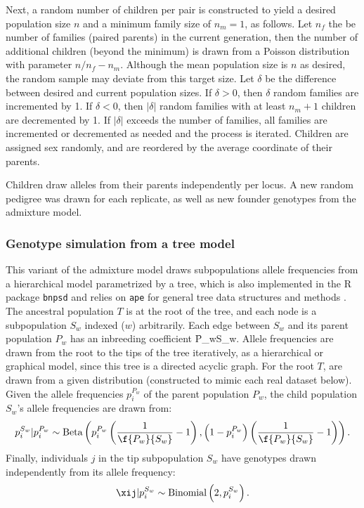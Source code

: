 \documentclass[11pt]{article}
\begin{document}
Next, a random number of children per pair is constructed to yield a desired population size $n$ and a minimum family size of $n_m=1$, as follows.
Let $n_f$ the be number of families (paired parents) in the current generation, then the number of additional children (beyond the minimum) is drawn from a Poisson distribution with parameter $n/n_f - n_m$.
Although the mean population size is $n$ as desired, the random sample may deviate from this target size.
Let $\delta$ be the difference between desired and current population sizes.
If $\delta > 0$, then $\delta$ random families are incremented by 1.
If $\delta < 0$, then $|\delta|$ random families with at least $n_m+1$ children are decremented by 1.
If $|\delta|$ exceeds the number of families, all families are incremented or decremented as needed and the process is iterated.
Children are assigned sex randomly, and are reordered by the average coordinate of their parents.

Children draw alleles from their parents independently per locus.
A new random pedigree was drawn for each replicate, as well as new founder genotypes from the admixture model.

\subsubsection{Genotype simulation from a tree model}

This variant of the admixture model draws subpopulations allele frequencies from a hierarchical model parametrized by a tree, which is also implemented in the R package \texttt{bnpsd} and relies on \texttt{ape} for general tree data structures and methods \citep{paradis_ape_2019}.
The ancestral population $T$ is at the root of the tree, and each node is a subpopulation $S_w$ indexed ($w$) arbitrarily.
Each edge between $S_w$ and its parent population $P_w$ has an inbreeding coefficient \f{P_w}{S_w}.
Allele frequencies are drawn from the root to the tips of the tree iteratively, as a hierarchical or graphical model, since this tree is a directed acyclic graph.
For the root $T$, \pit are drawn from a given distribution (constructed to mimic each real dataset below).
Given the allele frequencies $p_i^{P_w}$ of the parent population $P_w$, the child population $S_w$'s allele frequencies are drawn from:
$$
p_i^{S_w} | p_i^{P_w}
\sim
\text{Beta} \left(
  p_i^{P_w} \left( \frac{1}{ \f{P_w}{S_w} } - 1 \right),
  \left( 1 - p_i^{P_w} \right) \left( \frac{1}{ \f{P_w}{S_w} } - 1 \right)
\right)
.
$$
Finally, individuals $j$ in the tip subpopulation $S_w$ have genotypes drawn independently from its allele frequency:
$$
\xij | p_i^{S_w}
\sim
\text{Binomial}\left( 2, p_i^{S_w} \right)
.
$$
\end{document}
